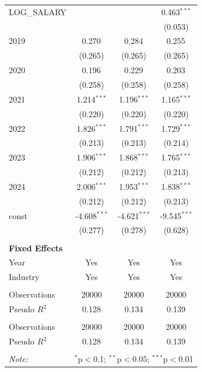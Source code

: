 \begin{table}[!htbp]
\begin{tabular}{@{\extracolsep{5pt}}lccc}
 LOG_SALARY & & & 0.463$^{***}$ \\
& & & (0.053) \\
 2019 & 0.270$^{}$ & 0.284$^{}$ & 0.255$^{}$ \\
& (0.265) & (0.265) & (0.265) \\
 2020 & 0.196$^{}$ & 0.229$^{}$ & 0.203$^{}$ \\
& (0.258) & (0.258) & (0.258) \\
 2021 & 1.214$^{***}$ & 1.196$^{***}$ & 1.165$^{***}$ \\
& (0.220) & (0.220) & (0.220) \\
 2022 & 1.826$^{***}$ & 1.791$^{***}$ & 1.729$^{***}$ \\
& (0.213) & (0.213) & (0.214) \\
 2023 & 1.906$^{***}$ & 1.868$^{***}$ & 1.765$^{***}$ \\
& (0.212) & (0.212) & (0.213) \\
 2024 & 2.006$^{***}$ & 1.953$^{***}$ & 1.838$^{***}$ \\
& (0.212) & (0.212) & (0.213) \\
 const & -4.608$^{***}$ & -4.621$^{***}$ & -9.545$^{***}$ \\
& (0.277) & (0.278) & (0.628) \\
 \hline &  &  &  \\
 \textbf{Fixed Effects} &  &  &  \\
 \quad Year & Yes & Yes & Yes \\
 \quad Industry & Yes & Yes & Yes \\
 \hline &  &  &  \\
 Observations & 20000 & 20000 & 20000 \\
 Pseudo $R^2$ & 0.128 & 0.134 & 0.139 \\
\hline \\[-1.8ex]
 Observations & 20000 & 20000 & 20000 \\
 Pseudo $R^2$ & 0.128 & 0.134 & 0.139 \\
\hline
\hline \\[-1.8ex]
\textit{Note:} & \multicolumn{3}{r}{$^{*}$p$<$0.1; $^{**}$p$<$0.05; $^{***}$p$<$0.01} \\
\end{tabular}
\end{table}